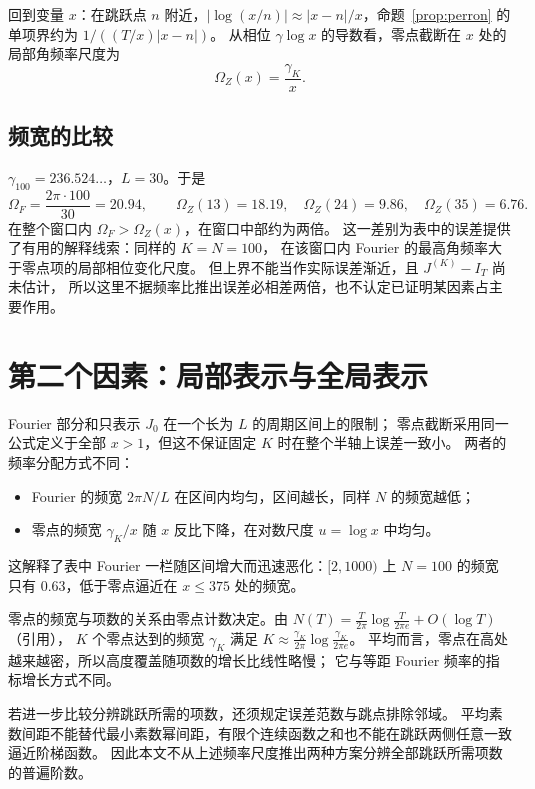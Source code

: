 \documentclass[11pt]{article}
\begin{document}
回到变量 $x$：在跳跃点 $n$ 附近，$|\log(x/n)|\approx|x-n|/x$，命题~\ref{prop:perron} 的单项界约为 $1/((T/x)|x-n|)$。
从相位 $\gamma\log x$ 的导数看，零点截断在 $x$ 处的局部角频率尺度为
\[
 \Omega_Z(x)=\frac{\gamma_K}x .
\]

\subsection{频宽的比较}
$\gamma_{100}=236.524\ldots$，$L=30$。于是
\[
 \Omega_F=\frac{2\pi\cdot100}{30}=20.94,\qquad
 \Omega_Z(13)=18.19,\quad\Omega_Z(24)=9.86,\quad\Omega_Z(35)=6.76 .
\]
在整个窗口内 $\Omega_F>\Omega_Z(x)$，在窗口中部约为两倍。
这一差别为表中的误差提供了有用的解释线索：同样的 $K=N=100$，
在该窗口内 Fourier 的最高角频率大于零点项的局部相位变化尺度。
但上界不能当作实际误差渐近，且 $J^{(K)}-I_T$ 尚未估计，
所以这里不据频率比推出误差必相差两倍，也不认定已证明某因素占主要作用。

\section{第二个因素：局部表示与全局表示}
Fourier 部分和只表示 $J_0$ 在一个长为 $L$ 的周期区间上的限制；
零点截断采用同一公式定义于全部 $x>1$，但这不保证固定 $K$ 时在整个半轴上误差一致小。
两者的频率分配方式不同：
\begin{itemize}
 \item Fourier 的频宽 $2\pi N/L$ 在区间内均匀，区间越长，同样 $N$ 的频宽越低；
 \item 零点的频宽 $\gamma_K/x$ 随 $x$ 反比下降，在对数尺度 $u=\log x$ 中均匀。
\end{itemize}
这解释了表中 Fourier 一栏随区间增大而迅速恶化：$[2,1000)$ 上 $N=100$ 的频宽只有 $0.63$，低于零点逼近在 $x\le375$ 处的频宽。

零点的频宽与项数的关系由零点计数决定。由 $N(T)=\frac T{2\pi}\log\frac T{2\pi e}+O(\log T)$（引用），
$K$ 个零点达到的频宽 $\gamma_K$ 满足 $K\approx\frac{\gamma_K}{2\pi}\log\frac{\gamma_K}{2\pi e}$。
平均而言，零点在高处越来越密，所以高度覆盖随项数的增长比线性略慢；
它与等距 Fourier 频率的指标增长方式不同。

若进一步比较分辨跳跃所需的项数，还须规定误差范数与跳点排除邻域。
平均素数间距不能替代最小素数幂间距，有限个连续函数之和也不能在跳跃两侧任意一致逼近阶梯函数。
因此本文不从上述频率尺度推出两种方案分辨全部跳跃所需项数的普遍阶数。
\end{document}
